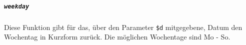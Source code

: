 

\subparagraph{\texttt{weekday}\\}
Diese Funktion gibt für das, über den Parameter \texttt{\$d} mitgegebene, Datum  den Wochentag in Kurzform zurück. Die möglichen Wochentage sind Mo - So.

